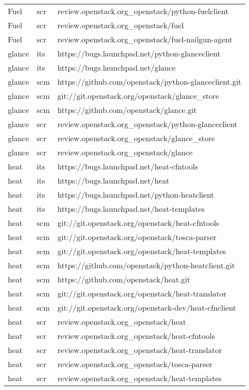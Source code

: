 \begin{center}
\begin{longtable}{|p{4cm}|p{1cm}|p{10cm}|}
Fuel&scr&review.openstack.org\_openstack/python-fuelclient\\ 
Fuel&scr&review.openstack.org\_openstack/fuel\\ 
Fuel&scr&review.openstack.org\_openstack/fuel-nailgun-agent\\ 
glance&its&https://bugs.launchpad.net/python-glanceclient\\ 
glance&its&https://bugs.launchpad.net/glance\\ 
glance&scm&https://github.com/openstack/python-glanceclient.git\\ 
glance&scm&git://git.openstack.org/openstack/glance\_store\\ 
glance&scm&https://github.com/openstack/glance.git\\ 
glance&scr&review.openstack.org\_openstack/python-glanceclient\\ 
glance&scr&review.openstack.org\_openstack/glance\_store\\ 
glance&scr&review.openstack.org\_openstack/glance\\ 
heat&its&https://bugs.launchpad.net/heat-cfntools\\ 
heat&its&https://bugs.launchpad.net/heat\\ 
heat&its&https://bugs.launchpad.net/python-heatclient\\ 
heat&its&https://bugs.launchpad.net/heat-templates\\ 
heat&scm&git://git.openstack.org/openstack/heat-cfntools\\ 
heat&scm&git://git.openstack.org/openstack/tosca-parser\\ 
heat&scm&git://git.openstack.org/openstack/heat-templates\\ 
heat&scm&https://github.com/openstack/python-heatclient.git\\ 
heat&scm&https://github.com/openstack/heat.git\\ 
heat&scm&git://git.openstack.org/openstack/heat-translator\\ 
heat&scm&git://git.openstack.org/openstack-dev/heat-cfnclient\\ 
heat&scr&review.openstack.org\_openstack/heat\\ 
heat&scr&review.openstack.org\_openstack/heat-cfntools\\ 
heat&scr&review.openstack.org\_openstack/heat-translator\\ 
heat&scr&review.openstack.org\_openstack/tosca-parser\\ 
heat&scr&review.openstack.org\_openstack/heat-templates\\ 

\end{longtable}
\end{center}
